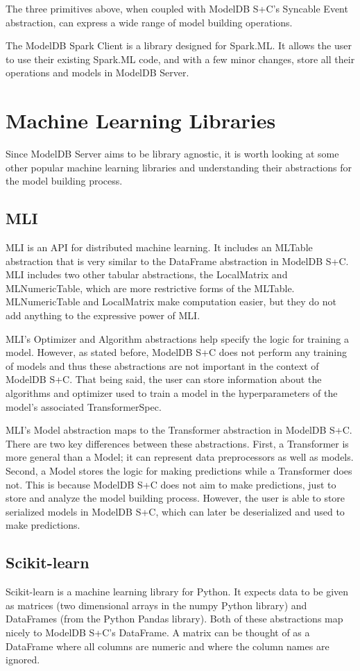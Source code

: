 The three primitives above, when coupled with ModelDB S+C's Syncable Event abstraction, can express a wide range
of model building operations.

The ModelDB Spark Client is a library designed for Spark.ML. It allows the user to use their existing
Spark.ML code, and with a few minor changes, store all their operations and models in ModelDB Server. 

\section{Machine Learning Libraries}
Since ModelDB Server aims to be library agnostic, it is worth looking at some other popular
machine learning libraries and understanding their abstractions for the model building process.

\subsection{MLI}
MLI \cite{mli} is an API for distributed machine learning. It includes an MLTable abstraction
that is very similar to the DataFrame abstraction in ModelDB S+C. MLI includes two other
tabular abstractions, the LocalMatrix and MLNumericTable, which are more restrictive forms of the
MLTable. MLNumericTable and LocalMatrix make computation easier, but they do not add anything to
the expressive power of MLI.

MLI's Optimizer and Algorithm abstractions help specify the logic for training a model. However,
as stated before, ModelDB S+C does not perform any training of models and thus these abstractions
are not important in the context of ModelDB S+C. That being said, the user can store information
about the algorithms and optimizer used to train a model in the hyperparameters of the model's associated
TransformerSpec.

MLI's Model abstraction maps to the Transformer abstraction in ModelDB S+C. There are two 
key differences between these abstractions. First, a Transformer is more general 
than a Model; it can represent data preprocessors as well as models. Second, a Model
stores the logic for making predictions while a Transformer does not. This is because
ModelDB S+C does not aim to make predictions, just to store and analyze the model building process. However,
the user is able to store serialized models in ModelDB S+C, which can later be deserialized and used to make
predictions.

\subsection{Scikit-learn}
Scikit-learn \cite{scikitlearn} is a machine learning library for Python. It expects data to
be given as matrices (two dimensional arrays in the numpy Python library) and DataFrames (from the Python
Pandas library). Both of these abstractions map nicely to ModelDB S+C's DataFrame.
A matrix can be thought of as a DataFrame where all columns are numeric and where the column names are ignored.


